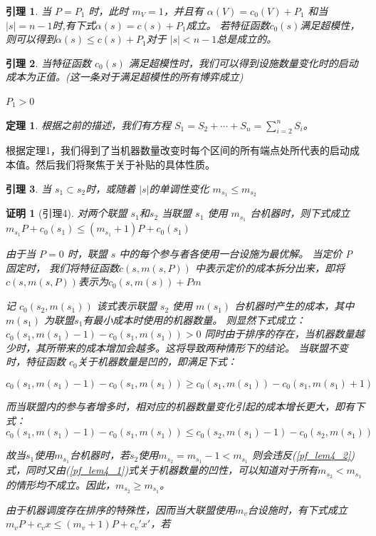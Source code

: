 \documentclass[UTF8]{article}
\newtheorem{thm}{\hspace{2em}定理}
\newtheorem{lem}{\hspace{2em}引理}
\newtheorem{pf}{\hspace{2em}证明}
\begin{document}
\begin{lem}\label{lem3}
当 $P=P_1$ 时，此时 $m_V=1$，并且有 $\alpha(V)=c_0(V)+P_1$ 和当 $\left| s \right|= n-1$时,有下式$\alpha(s)=c(s)+P_1$成立。
若特征函数$c_0(s)$满足超模性，则可以得到$\alpha(s) \leq c(s)+P_1$对于 $\left| s \right| < n-1 $总是成立的。
\end{lem}


\begin{lem}\label{lem4}
当特征函数 $c_0(s)$ 满足超模性时，我们可以得到设施数量变化时的启动成本为正值。(这一条对于满足超模性的所有博弈成立)

$P_1 > 0$

\end{lem}


\begin{thm}\label{thm1}
根据之前的描述，我们有方程
$S_{1}=S_{2}+\cdots+S_{n}=\sum_{i=2}^n S_i$。\\

\end{thm}

根据定理1，我们得到了当机器数量改变时每个区间的所有端点处所代表的启动成本值。然后我们将聚焦于关于补贴的具体性质。

\begin{lem}\label{lem5}
当 $s_1 \subset s_2$时，或随着 $\left|s\right|$的单调性变化
$m_{s_1} \leq m_{s_2}$
\end{lem}


\begin{pf}[引理4]
对两个联盟 $s_1$和$s_2$
当联盟 $s_1$ 使用 $m_{s_1}$ 台机器时，则下式成立
$m_{s_1}P+c_0(s_1) \leq (m_{s_1}+1)P+c_0(s_1)$


由于当 $P=0$ 时，联盟 $s$ 中的每个参与者各使用一台设施为最优解。
当定价 P 固定时，
我们将特征函数$c(s,m(s,P))$ 中表示定价的成本拆分出来，即将$c(s,m(s,P))$表示为$c_0(s,m(s))+Pm$

记 $c_0(s_2,m(s_1))$ 该式表示联盟 $s_2$ 使用 $m(s_1)$ 台机器时产生的成本，其中$m(s_1)$ 为联盟$s_1$有最小成本时使用的机器数量。
则显然下式成立：
$c_0(s_1,m(s_1)-1)-c_0(s_1,m(s_1))>0$
同时由于排序的存在，当机器数量越少时，其所带来的成本增加会越多。这将导致两种情形下的结论。
当联盟不变时，特征函数 $c_0$关于机器数量是凹的，即满足下式：

\begin{equation}\label{pf_lem4_1}
  c_0(s_1,m(s_1)-1)-c_0(s_1,m(s_1)) \geq
  c_0(s_1,m(s_1))-c_0(s_1,m(s_1)+1)
\end{equation}


而当联盟内的参与者增多时，相对应的机器数量变化引起的成本增长更大，即有下式：
\begin{equation}\label{pf_lem4_2}
  c_0(s_1,m(s_1)-1)-c_0(s_1,m(s_1)) \leq
  c_0(s_2,m(s_1)-1)-c_0(s_2,m(s_1))
\end{equation}

故当$s_1$使用$m_{s_1}$台机器时，若$s_2$使用$m_{s_2}=m_{s_1}-1 < m_{s_1}$ 则会违反(\ref{pf_lem4_2})式，同时又由(\ref{pf_lem4_1})式关于机器数量的凹性，可以知道对于所有$m_{s_2}<m_{s_1}$的情形均不成立。因此，$m_{s_2} \geq m_{s_1}$。


由于机器调度存在排序的特殊性，因而当大联盟使用$m_v$台设施时，有下式成立$m_vP+c_vx \leq (m_v+1)P+c_v'x'$，若


\end{pf}
\end{document}
